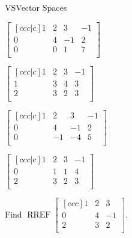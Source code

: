 \documentclass{article}
\newcommand{\RREF}{\operatorname{RREF}}
\begin{document}
\begin{module}{VS}{Vector Spaces}
\begin{readinessAssuranceTest}
  \begin{multicols}{4}
  \begin{readinessAssuranceTestChoices}
  \item
    \(
      \begin{bmatrix}[ccc|c]
        1 & 2 & 3 & -1 \\
        0 & 4 & -1 & 2 \\
        0 & 0 & 1 & 7\\
      \end{bmatrix}
    \)
  \item
    \(
      \begin{bmatrix}[ccc|c]
        1 & 2 & 3 & -1 \\
        1 & 3 & 4 & 3 \\
        2 & 3 & 2 & 3\\
      \end{bmatrix}
    \)
  \item
    \(
      \begin{bmatrix}[ccc|c]
        1 & 2 & 3 & -1 \\
        0 & 4 & -1 & 2 \\
        0 & -1 & -4 & 5 \\
      \end{bmatrix}
    \) %
      \item
    \(
      \begin{bmatrix}[ccc|c]
        1 & 2 & 3 & -1 \\
        0 & 1 & 1 & 4 \\
        2 & 3 & 2 & 3 \\
      \end{bmatrix}
    \)
  \end{readinessAssuranceTestChoices}
  \end{multicols}

\item Find
  \(\RREF
    \begin{bmatrix}[ccc]
      1 & 2 & 3 \\
      0 & 4 & -1 \\
      2 & 3 & 2 \\
    \end{bmatrix}
  \).


\end{readinessAssuranceTest}
\end{module}
\end{document}
